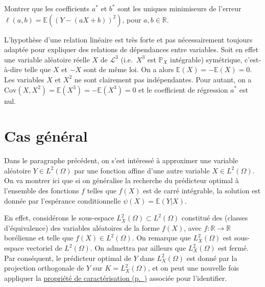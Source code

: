 \label{III-detail}
Montrer que les coefficients \(a^*\) et \(b^*\) sont les uniques
minimiseurs de l'erreur \(\ell(a,b)=\mathbb{E}((Y - (aX + b))^2)\), pour
\(a,b\in\mathbb{R}\).

\begin{remarque}\label{III-limites-de-la-ruxe9gression-linuxe9aire}

L'hypothèse d'une relation linéaire est très forte et pas nécessairement
toujours adaptée pour expliquer des relations de dépendances entre
variables. Soit en effet une variable aléatoire réelle \(X\) de
\(\mathcal{L}^3\) (i.e.~\(X^3\) est \(\mathbb{P}_X\) intégrable)
symétrique, c'est-à-dire telle que \(X\) et \(-X\) sont de même loi. On
a alors \(\mathbb{E}(X) = -\mathbb{E}(X) = 0\). Les variables \(X\) et
\(X^2\) ne sont clairement pas indépendantes. Pour autant, on a
\(\text{Cov}(X,X^2) = \mathbb{E}(X^3) = -\mathbb{E}(X^3) = 0\) et le
coefficient de régression \(a^*\) est nul.
\end{remarque}

\section{Cas général}\label{III-cas-guxe9nuxe9ral-1}

Dans le paragraphe précédent, on s'est intéressé à approximer une
variable aléatoire \(Y\in L^2(\Omega)\) par une fonction affine d'une
autre variable \(X\in L^2(\Omega)\). On va montrer ici que si on
généralise la recherche du prédicteur optimal à l'ensemble des fonctions
\(f\) telles que \(f(X)\) est de carré intégrable, la solution est
donnée par l'espérance conditionnelle \(\psi(X) = \mathbb{E}(Y|X)\).

En effet, considérons le sous-espace
\(L^2_X(\Omega)\subset L^2(\Omega)\) constitué des (classes
d'équivalence) des variables aléatoires de la forme \(f(X)\), avec
\(f : \mathbb{R}\rightarrow\mathbb{R}\) borélienne et telle que
\(f(X) \in L^2(\Omega)\). On remarque que \(L^2_X(\Omega)\) est
sous-espace vectoriel de \(L^2(\Omega)\). On admettra par ailleurs que
\(L^2_X(\Omega)\) est fermé. Par conséquent, le prédicteur optimal de
\(Y\) dans \(L^2_X(\Omega)\) est donné par la projection orthogonale de
\(Y\) sur \(K=L^2_X(\Omega)\), et on peut une nouvelle fois appliquer la
\protect\hyperref[III-identEC]{propriété de
caractérisation (p.~\pageref*{III-identEC})} associée pour l'identifier.

